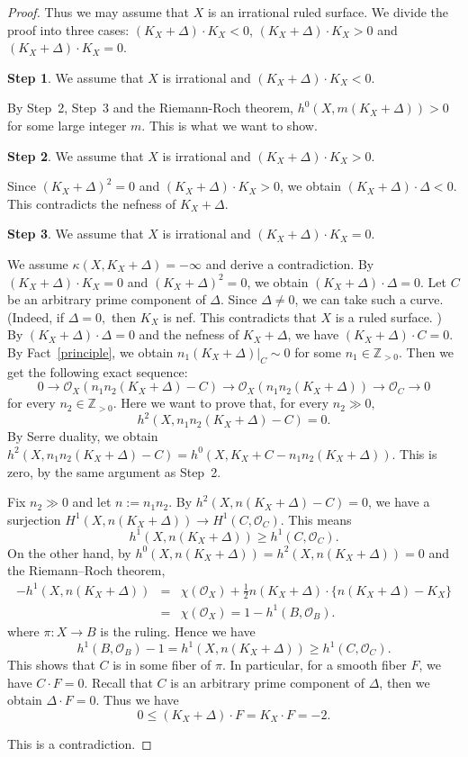 \documentclass[12pt,twoside]{amsart}
\theoremstyle{definition}
\newtheorem{step}{Step}
\begin{document}
\begin{proof}
Thus we may assume that $X$ is an irrational ruled surface. 
We divide the proof into three cases: 
$(K_X+\Delta)\cdot K_X<0$, 
$(K_X+\Delta)\cdot K_X>0$ and 
$(K_X+\Delta)\cdot K_X=0$. 


\begin{step}
We assume that $X$ is irrational and $(K_X+\Delta)\cdot K_X<0$. 

By Step~2, Step~3 and the Riemann-Roch theorem, 
$h^0(X, m(K_X+\Delta))>0$ for some large integer $m$. 
This is what we want to show. 
\end{step}

\begin{step}
We assume that $X$ is irrational and $(K_X+\Delta)\cdot K_X>0$. 

Since $(K_X+\Delta)^2=0$ and $(K_X+\Delta)\cdot K_X>0$, 
we obtain $(K_X+\Delta)\cdot \Delta<0$. 
This contradicts the nefness of $K_X+\Delta$. 
\end{step}

\begin{step}
We assume that $X$ is irrational and $(K_X+\Delta)\cdot K_X=0$. 

We assume $\kappa(X, K_X+\Delta)=-\infty$ and derive a contradiction. 
By $(K_X+\Delta)\cdot K_X=0$ and $(K_X+\Delta)^2=0$, 
we obtain $(K_X+\Delta)\cdot \Delta=0$. 
Let $C$ be an arbitrary prime component of $\Delta$. 
Since $\Delta\neq 0$, we can take such a curve. 
(Indeed, if $\Delta=0,$ 
then $K_X$ is nef. 
This contradicts that $X$ is a ruled surface. )
By $(K_X+\Delta)\cdot \Delta=0$ and the nefness of $K_X+\Delta$, 
we have $(K_X+\Delta)\cdot C=0$. 
By Fact~\ref{principle}, 
we obtain $n_1(K_X+\Delta)|_C \sim 0$ for some $n_1\in\mathbb Z_{>0}$. 
Then we get the following exact sequence: 
\[0 \to 
\mathcal{O}_X(n_1n_2(K_X+\Delta)-C) \to 
\mathcal{O}_X(n_1n_2(K_X+\Delta)) \to 
\mathcal{O}_C \to 
0\] 
for every $n_2\in\mathbb Z_{>0}.$ 
Here we want to prove that, for every $n_2\gg 0,$ 
$$h^2(X, n_1n_2(K_X+\Delta)-C)=0.$$
By Serre duality, 
we obtain 
$h^2(X, n_1n_2(K_X+\Delta)-C)=
h^0(X, K_X+C-n_1n_2(K_X+\Delta))$. 
This is zero, by the same argument as Step~2. 

Fix $n_2\gg 0$ and let $n:=n_1n_2$. 
By $h^2(X, n(K_X+\Delta)-C)=0$, we have a surjection 
$H^1(X, n(K_X+\Delta)) \to H^1(C, \mathcal{O}_C)$. 
This means $$h^1(X, n(K_X+\Delta)) \geq h^1(C, \mathcal{O}_C).$$ 
On the other hand, 
by $h^0(X, n(K_X+\Delta))=h^2(X, n(K_X+\Delta))=0$ and 
the Riemann--Roch theorem, 
\begin{eqnarray*}
-h^1(X, n(K_X+\Delta))&=&
\chi(\mathcal{O}_X)+\frac{1}{2}n(K_X+\Delta)\cdot\{n(K_X+\Delta)-K_X\}\\
&=&\chi(\mathcal{O}_X)=1-h^1(B, \mathcal{O}_B).
\end{eqnarray*} 
where $\pi:X \to B$ is the ruling. 
Hence we have 
$$h^1(B, \mathcal{O}_B)-1=
h^1(X, n(K_X+\Delta)) \geq h^1(C, \mathcal{O}_C). $$
This shows that $C$ is in some fiber of $\pi$. 
In particular, for a smooth fiber $F$, we have $C\cdot F=0$. 
Recall that $C$ is an arbitrary prime component of $\Delta$, 
then we obtain $\Delta\cdot F=0$. 
Thus we have 
$$0 \leq (K_X+\Delta)\cdot F=K_X\cdot F=-2.$$
\end{step}
This is a contradiction. 
\end{proof}
\end{document}

